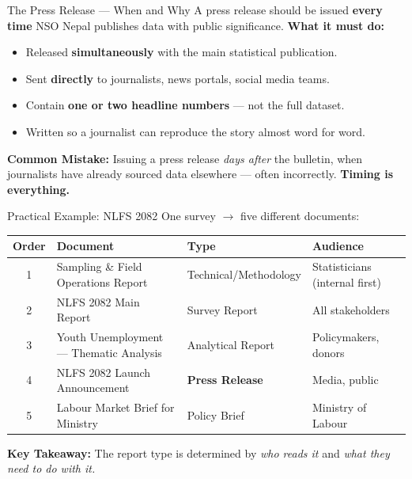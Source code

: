 \documentclass[xcolor={table,dvipsnames},aspectratio=169,11pt]{beamer}
\begin{document}
\begin{frame}{The Press Release --- When and Why}
    \bullet A press release should be issued \textbf{every time} NSO Nepal publishes data with public significance.
    \vskip 0.2cm
    \textbf{What it must do:}
    \begin{itemize}
        \item Released \textbf{simultaneously} with the main statistical publication.
        \item Sent \textbf{directly} to journalists, news portals, social media teams.
        \item Contain \textbf{one or two headline numbers} --- not the full dataset.
        \item Written so a journalist can reproduce the story almost word for word.
    \end{itemize}
    \vskip 0.2cm
    \begin{warnbox}
    \footnotesize \textbf{Common Mistake:} Issuing a press release \emph{days after} the bulletin, when journalists have already sourced data elsewhere --- often incorrectly. \textbf{Timing is everything.}
    \end{warnbox}
\end{frame}

\begin{frame}{Practical Example: NLFS 2082}
    One survey $\rightarrow$ five different documents:
    \vskip 0.2cm
    \footnotesize
    \begin{tabular}{clll}
    \toprule
    \rowcolor{nsoBlue}\color{white}\bfseries Order & \color{white}\bfseries Document & \color{white}\bfseries Type & \color{white}\bfseries Audience \\
    \midrule
    1 & Sampling \& Field Operations Report & Technical/Methodology & Statisticians (internal first) \\
    2 & NLFS 2082 Main Report & Survey Report & All stakeholders \\
    3 & Youth Unemployment --- Thematic Analysis & Analytical Report & Policymakers, donors \\
    4 & NLFS 2082 Launch Announcement & \textbf{Press Release} & Media, public \\
    5 & Labour Market Brief for Ministry & Policy Brief & Ministry of Labour \\
    \bottomrule
    \end{tabular}
    \vskip 0.2cm
    \begin{takeawaybox}
    \scriptsize \textbf{Key Takeaway:} The report type is determined by \emph{who reads it} and \emph{what they need to do with it.}
    \end{takeawaybox}
\end{frame}
\end{document}
